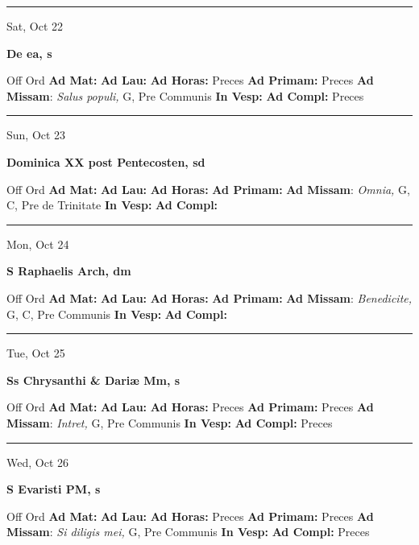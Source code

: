 \documentclass[letterpaper, 10pt]{article}
\begin{document}
\hrule
\begin{center}
Sat, Oct 22
\end{center}\textbf{ \large De ea, \textnormal{\normalsize s}}
\begin{justify}
Off Ord
\textbf{Ad Mat: }
\textbf{Ad Lau: }
\textbf{Ad Horas: }Preces
\textbf{Ad Primam: }Preces
\textbf{Ad Missam}: \textit{Salus populi,} G, Pre Communis
\textbf{In Vesp: }
\textbf{Ad Compl: }Preces\end{justify}



\hrule
\begin{center}
Sun, Oct 23
\end{center}\textbf{ \large Dominica XX post Pentecosten, \textnormal{\normalsize sd}}
\begin{justify}
Off Ord
\textbf{Ad Mat: }
\textbf{Ad Lau: }
\textbf{Ad Horas: }
\textbf{Ad Primam: }
\textbf{Ad Missam}: \textit{Omnia,} G, C, Pre de Trinitate
\textbf{In Vesp: }
\textbf{Ad Compl: }\end{justify}



\hrule
\begin{center}
Mon, Oct 24
\end{center}\textbf{ \large S Raphaelis Arch, \textnormal{\normalsize dm}}
\begin{justify}
Off Ord
\textbf{Ad Mat: }
\textbf{Ad Lau: }
\textbf{Ad Horas: }
\textbf{Ad Primam: }
\textbf{Ad Missam}: \textit{Benedicite,} G, C, Pre Communis
\textbf{In Vesp: }
\textbf{Ad Compl: }\end{justify}



\hrule
\begin{center}
Tue, Oct 25
\end{center}\textbf{ \large Ss Chrysanthi \& Dariæ Mm, \textnormal{\normalsize s}}
\begin{justify}
Off Ord
\textbf{Ad Mat: }
\textbf{Ad Lau: }
\textbf{Ad Horas: }Preces
\textbf{Ad Primam: }Preces
\textbf{Ad Missam}: \textit{Intret,} G, Pre Communis
\textbf{In Vesp: }
\textbf{Ad Compl: }Preces\end{justify}



\hrule
\begin{center}
Wed, Oct 26
\end{center}\textbf{ \large S Evaristi PM, \textnormal{\normalsize s}}
\begin{justify}
Off Ord
\textbf{Ad Mat: }
\textbf{Ad Lau: }
\textbf{Ad Horas: }Preces
\textbf{Ad Primam: }Preces
\textbf{Ad Missam}: \textit{Si diligis mei,} G, Pre Communis
\textbf{In Vesp: }
\textbf{Ad Compl: }Preces\end{justify}
\end{document}
